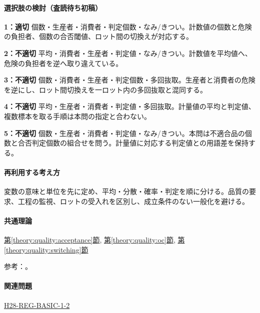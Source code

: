 \paragraph{選択肢の検討（査読待ち初稿）}\mbox{}\par

\noindent\textbf{1：適切} 個数・生産者・消費者・判定個数・なみ/きつい。計数値の個数と危険の負担者、個数の合否閾値、ロット間の切換えが対応する。\par

\noindent\textbf{2：不適切} 平均・消費者・生産者・判定値・なみ/きつい。計数値を平均値へ、危険の負担者を逆へ取り違えている。\par

\noindent\textbf{3：不適切} 個数・消費者・生産者・判定個数・多回抜取。生産者と消費者の危険を逆にし、ロット間切換えを一ロット内の多回抜取と混同する。\par

\noindent\textbf{4：不適切} 平均・生産者・消費者・判定値・多回抜取。計量値の平均と判定値、複数標本を取る手順は本問の指定と合わない。\par

\noindent\textbf{5：不適切} 個数・生産者・消費者・判定値・なみ/きつい。本問は不適合品の個数と合否判定個数の組合せを問う。計量値に対応する判定値との用語差を保持する。\par

\paragraph{再利用する考え方} 変数の意味と単位を先に定め、平均・分散・確率・判定を順に分ける。品質の要求、工程の監視、ロットの受入れを区別し、成立条件のない一般化を避ける。

\paragraph{共通理論} \hyperref[theory:quality:acceptance]{第\ref*{theory:quality:acceptance}節}, \hyperref[theory:quality:oc]{第\ref*{theory:quality:oc}節}, \hyperref[theory:quality:switching]{第\ref*{theory:quality:switching}節}

\par 参考：\cite{quality_nist_sampling,quality_nist_oc}。

\paragraph{関連問題} \hyperref[q:h28-reg-basic-1-2]{H28-REG-BASIC-1-2}

